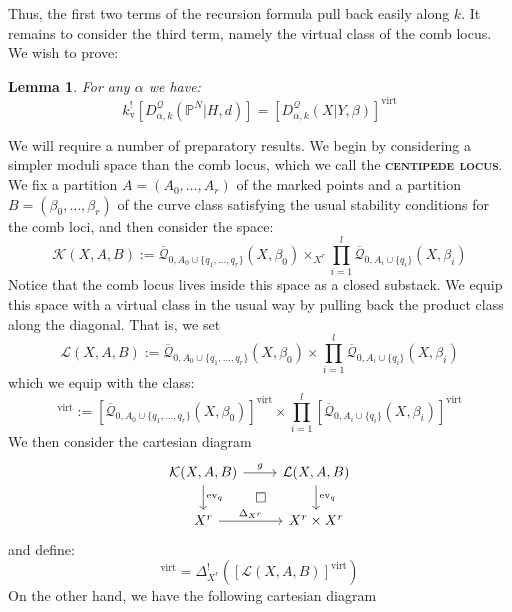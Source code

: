\documentclass[11pt]{amsart}
\newcommand{\Q}[4]{\overline{\mathcal Q}_{#1,#2}(#3,#4)}
\newcommand{\PP}{\mathbb P}
\newcommand{\virt}[1]{[#1]^{\operatorname{virt}}}
\newcommand{\ev}{\operatorname{ev}}
\newcommand{\ildef}[1]{\textbf{\textsc{#1}}}
\theoremstyle{plain}
\newtheorem{lem}[thm]{Lemma}
\theoremstyle{definition}
\begin{document}
Thus, the first two terms of the recursion formula pull back easily along $k$. It remains to consider the third term, namely the virtual class of the comb locus. We wish to prove:
\begin{lem} \label{Comb loci pull back} For any $\alpha$ we have:
\begin{equation*} k_{\text{v}}^! [D^\mathcal{Q}_{\alpha,k}(\PP^N|H,d)] = \virt{D^\mathcal{Q}_{\alpha,k}(X|Y,\beta)} \end{equation*} \end{lem}
We will require a number of preparatory results. We begin by considering a simpler moduli space than the comb locus, which we call the \ildef{centipede locus}. We fix a partition $A=(A_0,\ldots,A_r)$ of the marked points and a partition $B=(\beta_0, \ldots, \beta_r)$ of the curve class satisfying the usual stability conditions for the comb loci, and then consider the space:
\begin{equation*} \mathcal{K}(X,A,B) := \Q{0}{A_0 \cup \{ q_1, \ldots, q_r \}}{X}{\beta_0} \times_{X^r} \prod_{i=1}^l \Q{0}{A_i\cup\{q_i\}}{X}{\beta_i} \end{equation*}
Notice that the comb locus lives inside this space as a closed substack. We equip this space with a virtual class in the usual way by pulling back the product class along the diagonal. That is, we set
\begin{equation*} \mathcal{L}(X,A,B) :=  \Q{0}{A_0 \cup \{ q_1, \ldots, q_r \}}{X}{\beta_0} \times \prod_{i=1}^l \Q{0}{A_i\cup\{q_i\}}{X}{\beta_i} \end{equation*}
which we equip with the class:
\begin{equation*} \virt{\mathcal{L}(X,A,B)} := \virt{\Q{0}{A_0 \cup \{ q_1, \ldots, q_r \}}{X}{\beta_0}} \times \prod_{i=1}^l \virt{\Q{0}{A_i\cup\{q_i\}}{X}{\beta_i}} \end{equation*}
We then consider the cartesian diagram
\begin{equation} \label{Product diagram}
\begin{tikzcd}
\mathcal{K}(X,A,B) \ar[r,"g"] \ar[d,"\ev_q"] \ar[rd,phantom,"\square"] & \mathcal{L}(X,A,B) \ar[d,"\ev_q"] \\
X^r \ar[r,"\Delta_{X^r}"] & X^r \times X^r
\end{tikzcd}
\end{equation}
and define:
\begin{equation*} \virt{\mathcal{K}(X,A,B)} = \Delta_{X^r}^! (\virt{\mathcal{L}(X,A,B)}) \end{equation*}
On the other hand, we have the following cartesian diagram
\end{document}
